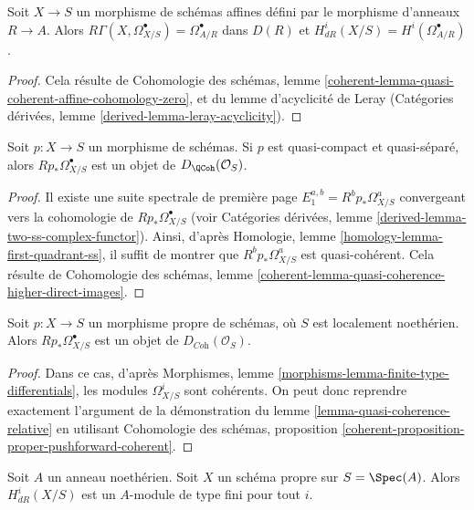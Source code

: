 \begin{lemma}
\label{lemma-de-rham-affine}
Soit $X \to S$ un morphisme de schémas affines défini par le morphisme d'anneaux
$R \to A$. Alors $R\Gamma(X, \Omega^\bullet_{X/S}) = \Omega^\bullet_{A/R}$
dans $D(R)$ et $H^i_{dR}(X/S) = H^i(\Omega^\bullet_{A/R})$.
\end{lemma}

\begin{proof}
Cela résulte de Cohomologie des schémas, lemme
\ref{coherent-lemma-quasi-coherent-affine-cohomology-zero},
et du lemme d'acyclicité de Leray
(Catégories dérivées, lemme \ref{derived-lemma-leray-acyclicity}).
\end{proof}

\begin{lemma}
\label{lemma-quasi-coherence-relative}
Soit $p : X \to S$ un morphisme de schémas. Si $p$ est quasi-compact
et quasi-séparé, alors $Rp_*\Omega^\bullet_{X/S}$ est un objet
de $D_\QCoh(\mathcal{O}_S)$.
\end{lemma}

\begin{proof}
Il existe une suite spectrale de première page
$E_1^{a, b} = R^bp_*\Omega^a_{X/S}$ convergeant vers
la cohomologie de $Rp_*\Omega^\bullet_{X/S}$
(voir Catégories dérivées, lemme \ref{derived-lemma-two-ss-complex-functor}).
Ainsi, d'après Homologie, lemme \ref{homology-lemma-first-quadrant-ss},
il suffit de montrer que $R^bp_*\Omega^a_{X/S}$ est quasi-cohérent.
Cela résulte de Cohomologie des schémas, lemme
\ref{coherent-lemma-quasi-coherence-higher-direct-images}.
\end{proof}

\begin{lemma}
\label{lemma-coherence-relative}
Soit $p : X \to S$ un morphisme propre de schémas, où $S$ est localement
noethérien. Alors $Rp_*\Omega^\bullet_{X/S}$ est un objet
de $D_{\textit{Coh}}(\mathcal{O}_S)$.
\end{lemma}

\begin{proof}
Dans ce cas, d'après Morphismes, lemme \ref{morphisms-lemma-finite-type-differentials},
les modules $\Omega^i_{X/S}$ sont cohérents. On peut donc reprendre exactement
l'argument de la démonstration du lemme \ref{lemma-quasi-coherence-relative}
en utilisant Cohomologie des schémas, proposition
\ref{coherent-proposition-proper-pushforward-coherent}.
\end{proof}

\begin{lemma}
\label{lemma-finite-de-Rham}
Soit $A$ un anneau noethérien. Soit $X$ un schéma propre sur $S = \Spec(A)$.
Alors $H^i_{dR}(X/S)$ est un $A$-module de type fini pour tout $i$.
\end{lemma}

